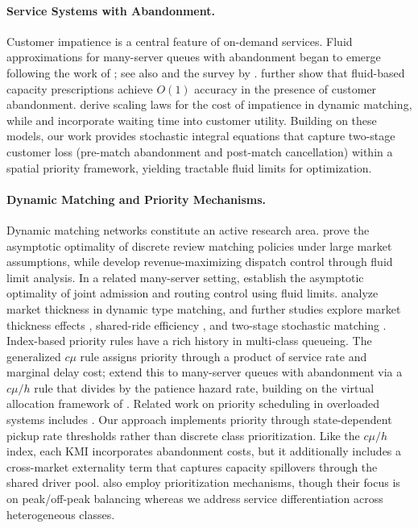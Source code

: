 \paragraph{Service Systems with Abandonment.}
Customer impatience is a central feature of on-demand services.
Fluid approximations for many-server queues with abandonment began to emerge following the work of \citet{whitt_FluModMul_2006}; see also \citet{Zhang2013, LiuWhitt2012, LiuWhitt2014, Kang2014, LongZhang2014} and the survey by \citet{dai_ManSerQue_2012}.
\citet{bassamboo_AccFluMod_2010} further show that fluid-based capacity prescriptions achieve $O(1)$ accuracy in the presence of customer abandonment.
\citet{doi:10.1287/mnsc.2023.01513} derive scaling laws for the cost of impatience in dynamic matching, while \citet{Bai2019} and \citet{feng2021we} incorporate waiting time into customer utility.
Building on these models, our work provides stochastic integral equations that capture two-stage customer loss (pre-match abandonment and post-match cancellation) within a spatial priority framework, yielding tractable fluid limits for optimization.

\paragraph{Dynamic Matching and Priority Mechanisms.}
Dynamic matching networks constitute an active research area.
\citet{GurvichWard2014} prove the asymptotic optimality of discrete review matching policies under large market assumptions, while \citet{OzkanWard2020} develop revenue-maximizing dispatch control through fluid limit analysis.
In a related many-server setting, \citet{bassamboo_DynRouAdm_2005} establish the asymptotic optimality of joint admission and routing control using fluid limits.
\citet{HuZhou2022} analyze market thickness in dynamic type matching, and further studies explore market thickness effects \citep{doi:10.1086/704761, baccara2020optimal}, shared-ride efficiency \citep{Taylor2024}, and two-stage stochastic matching \citep{CandoganBalseiro2024}.
Index-based priority rules have a rich history in multi-class queueing.
The generalized $c\mu$ rule \citep{vanmieghemDynamicSchedulingConvex1995, mandelbaumSchedulingFlexibleServers2004} assigns priority through a product of service rate and marginal delay cost; \citet{longDynamicSchedulingMulticlass2020} extend this to many-server queues with abandonment via a $c\mu/h$ rule that divides by the patience hazard rate, building on the virtual allocation framework of \citet{long_VirAllPol_2019}.
Related work on priority scheduling in overloaded systems includes \citet{PuhaWard2019, AKS2013, MandelbaumPats1995, MandelbaumPats1998}.
Our approach implements priority through state-dependent pickup rate thresholds rather than discrete class prioritization.
Like the $c\mu/h$ index, each KMI incorporates abandonment costs, but it additionally includes a cross-market externality term that captures capacity spillovers through the shared driver pool.
\citet{doi:10.1287/msom.2022.0216} also employ prioritization mechanisms, though their focus is on peak/off-peak balancing whereas we address service differentiation across heterogeneous classes.

